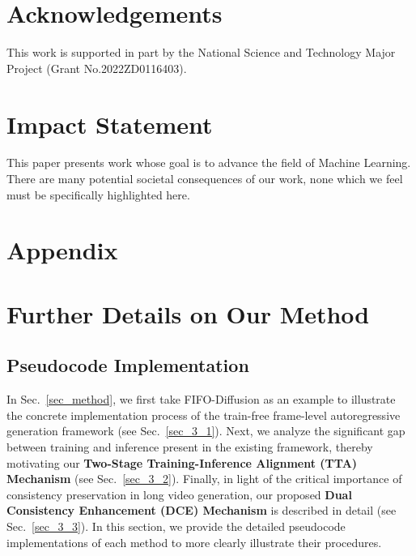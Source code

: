 \documentclass{llmxive}
\providecommand{\thetable}{A\arabic{table}}
\providecommand{\theequation}{A\arabic{equation}}
\providecommand{\thefigure}{A\arabic{figure}}
\begin{document}
\section*{Acknowledgements}
This work is supported in part by the National Science and Technology Major Project (Grant No.2022ZD0116403).

\section*{Impact Statement}

This paper presents work whose goal is to advance the field of Machine
Learning. There are many potential societal consequences of our work, none
which we feel must be specifically highlighted here.

\nocite{langley00}





\appendix

\setcounter{table}{0}
\renewcommand{\thetable}{A\arabic{table}}
\setcounter{equation}{0}
\renewcommand{\theequation}{A\arabic{equation}}
\setcounter{figure}{0}
\renewcommand{\thefigure}{A\arabic{figure}}

\section*{Appendix}



\section{Further Details on Our Method}
\subsection{Pseudocode Implementation}
\label{app:pseudocode}
In Sec.~\ref{sec_method}, we first take FIFO-Diffusion as an example to illustrate the concrete implementation process of the train-free frame-level autoregressive generation framework (see Sec.~\ref{sec_3_1}). Next, we analyze the significant gap between training and inference present in the existing framework, thereby motivating our \textbf{Two-Stage Training-Inference Alignment (TTA) Mechanism } (see Sec.~\ref{sec_3_2}).
Finally, in light of the critical importance of consistency preservation in long video generation, our proposed \textbf{Dual Consistency Enhancement (DCE) Mechanism } is described in detail (see Sec.~\ref{sec_3_3}).
In this section, we provide the detailed pseudocode implementations of each method to more clearly illustrate their procedures.
\end{document}
